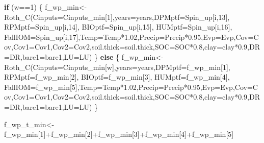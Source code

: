 \documentclass[
  10pt,
  b5paper,
]{book}
\newenvironment{Shaded}{\begin{snugshade}}{\end{snugshade}}
\newcommand{\AttributeTok}[1]{\textcolor[rgb]{0.77,0.63,0.00}{#1}}
\newcommand{\ControlFlowTok}[1]{\textcolor[rgb]{0.13,0.29,0.53}{\textbf{#1}}}
\newcommand{\DecValTok}[1]{\textcolor[rgb]{0.00,0.00,0.81}{#1}}
\newcommand{\FloatTok}[1]{\textcolor[rgb]{0.00,0.00,0.81}{#1}}
\newcommand{\FunctionTok}[1]{\textcolor[rgb]{0.00,0.00,0.00}{#1}}
\newcommand{\NormalTok}[1]{#1}
\newcommand{\OtherTok}[1]{\textcolor[rgb]{0.56,0.35,0.01}{#1}}
\newcommand{\SpecialCharTok}[1]{\textcolor[rgb]{0.00,0.00,0.00}{#1}}
\begin{document}
\begin{Shaded}
\begin{Highlighting}[]
\ControlFlowTok{if}\NormalTok{ (w}\SpecialCharTok{==}\DecValTok{1}\NormalTok{) \{}
\NormalTok{f\_wp\_min}\OtherTok{\textless{}{-}}\FunctionTok{Roth\_C}\NormalTok{(}\AttributeTok{Cinputs=}\NormalTok{Cinputs\_min[}\DecValTok{1}\NormalTok{],}\AttributeTok{years=}\NormalTok{years,}\AttributeTok{DPMptf=}\NormalTok{Spin\_up[i,}\DecValTok{13}\NormalTok{], }\AttributeTok{RPMptf=}\NormalTok{Spin\_up[i,}\DecValTok{14}\NormalTok{], }\AttributeTok{BIOptf=}\NormalTok{Spin\_up[i,}\DecValTok{15}\NormalTok{], }\AttributeTok{HUMptf=}\NormalTok{Spin\_up[i,}\DecValTok{16}\NormalTok{], }\AttributeTok{FallIOM=}\NormalTok{Spin\_up[i,}\DecValTok{17}\NormalTok{],}\AttributeTok{Temp=}\NormalTok{Temp}\SpecialCharTok{*}\FloatTok{1.02}\NormalTok{,}\AttributeTok{Precip=}\NormalTok{Precip}\SpecialCharTok{*}\FloatTok{0.95}\NormalTok{,}\AttributeTok{Evp=}\NormalTok{Evp,}\AttributeTok{Cov=}\NormalTok{Cov,}\AttributeTok{Cov1=}\NormalTok{Cov1,}\AttributeTok{Cov2=}\NormalTok{Cov2,}\AttributeTok{soil.thick=}\NormalTok{soil.thick,}\AttributeTok{SOC=}\NormalTok{SOC}\SpecialCharTok{*}\FloatTok{0.8}\NormalTok{,}\AttributeTok{clay=}\NormalTok{clay}\SpecialCharTok{*}\FloatTok{0.9}\NormalTok{,}\AttributeTok{DR=}\NormalTok{DR,}\AttributeTok{bare1=}\NormalTok{bare1,}\AttributeTok{LU=}\NormalTok{LU)}
\NormalTok{\} }\ControlFlowTok{else}\NormalTok{ \{}
\NormalTok{f\_wp\_min}\OtherTok{\textless{}{-}}\FunctionTok{Roth\_C}\NormalTok{(}\AttributeTok{Cinputs=}\NormalTok{Cinputs\_min[w],}\AttributeTok{years=}\NormalTok{years,}\AttributeTok{DPMptf=}\NormalTok{f\_wp\_min[}\DecValTok{1}\NormalTok{], }\AttributeTok{RPMptf=}\NormalTok{f\_wp\_min[}\DecValTok{2}\NormalTok{], }\AttributeTok{BIOptf=}\NormalTok{f\_wp\_min[}\DecValTok{3}\NormalTok{], }\AttributeTok{HUMptf=}\NormalTok{f\_wp\_min[}\DecValTok{4}\NormalTok{], }\AttributeTok{FallIOM=}\NormalTok{f\_wp\_min[}\DecValTok{5}\NormalTok{],}\AttributeTok{Temp=}\NormalTok{Temp}\SpecialCharTok{*}\FloatTok{1.02}\NormalTok{,}\AttributeTok{Precip=}\NormalTok{Precip}\SpecialCharTok{*}\FloatTok{0.95}\NormalTok{,}\AttributeTok{Evp=}\NormalTok{Evp,}\AttributeTok{Cov=}\NormalTok{Cov,}\AttributeTok{Cov1=}\NormalTok{Cov1,}\AttributeTok{Cov2=}\NormalTok{Cov2,}\AttributeTok{soil.thick=}\NormalTok{soil.thick,}\AttributeTok{SOC=}\NormalTok{SOC}\SpecialCharTok{*}\FloatTok{0.8}\NormalTok{,}\AttributeTok{clay=}\NormalTok{clay}\SpecialCharTok{*}\FloatTok{0.9}\NormalTok{,}\AttributeTok{DR=}\NormalTok{DR,}\AttributeTok{bare1=}\NormalTok{bare1,}\AttributeTok{LU=}\NormalTok{LU)}
\NormalTok{\}}

\NormalTok{f\_wp\_t\_min}\OtherTok{\textless{}{-}}\NormalTok{f\_wp\_min[}\DecValTok{1}\NormalTok{]}\SpecialCharTok{+}\NormalTok{f\_wp\_min[}\DecValTok{2}\NormalTok{]}\SpecialCharTok{+}\NormalTok{f\_wp\_min[}\DecValTok{3}\NormalTok{]}\SpecialCharTok{+}\NormalTok{f\_wp\_min[}\DecValTok{4}\NormalTok{]}\SpecialCharTok{+}\NormalTok{f\_wp\_min[}\DecValTok{5}\NormalTok{]}


\end{Highlighting}
\end{Shaded}
\end{document}
